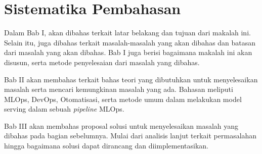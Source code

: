 \section{Sistematika Pembahasan}

Dalam Bab I, akan dibahas terkait latar belakang dan tujuan dari makalah ini.
Selain itu, juga dibahas terkait masalah-masalah yang akan dibahas dan batasan dari masalah yang akan dibahas.
Bab I juga berisi bagaimana makalah ini akan disusun, serta metode penyelesaian dari masalah yang dibahas.

Bab II akan membahas terkait bahas teori yang dibutuhkan untuk menyelesaikan masalah serta mencari kemungkinan masalah yang ada.
Bahasan meliputi MLOps, DevOps, Otomatisasi, serta metode umum dalam melakukan model serving dalam sebuah \textit{pipeline} MLOps.

Bab III akan membahas proposal solusi untuk menyelesaikan masalah yang dibahas pada bagian sebelumnya.
Mulai dari analisis lanjut terkait permasalahan hingga bagaimana solusi dapat dirancang dan diimplementasikan.